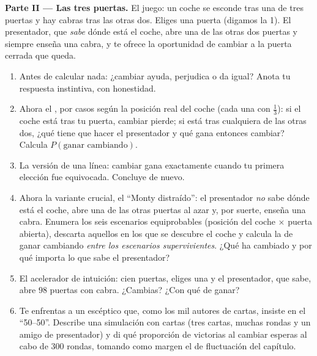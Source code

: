 \begin{problem}
\medskip
\noindent\textbf{Parte II --- Las tres puertas.}
El juego: un coche se esconde tras una de tres puertas y hay cabras tras
las otras dos. Eliges una puerta (digamos la 1). El presentador, que
\emph{sabe} dónde está el coche, abre una de las otras dos puertas y
siempre enseña una cabra, y te ofrece la oportunidad de cambiar a la
puerta cerrada que queda.
\begin{enumerate}[resume]
  \item Antes de calcular nada: ¿cambiar ayuda, perjudica o da igual?
        Anota tu respuesta instintiva, con honestidad.
  \item Ahora el , por casos según la posición real del coche (cada
        una con  $\frac13$): si el coche está tras tu puerta,
        cambiar pierde; si está tras cualquiera de las otras dos, ¿qué
        tiene que hacer el presentador y qué gana entonces cambiar?
        Calcula $P(\text{ganar cambiando})$.
  \item La versión de una línea: cambiar gana exactamente cuando tu
        primera elección fue equivocada. Concluye de nuevo.
  \item Ahora la variante crucial, el ``Monty distraído'': el presentador
        \emph{no} sabe dónde está el coche, abre una de las otras puertas
        al azar y, por suerte, enseña una cabra. Enumera los seis
        escenarios equiprobables (posición del coche $\times$ puerta
        abierta), descarta aquellos en los que se descubre el coche y
        calcula la  de ganar cambiando \emph{entre los
        escenarios supervivientes}. ¿Qué ha cambiado y por qué importa lo
        que sabe el presentador?
  \item El acelerador de intuición: cien puertas, eliges una y el
        presentador, que sabe, abre $98$ puertas con cabra. ¿Cambias? ¿Con
        qué  de ganar?
  \item Te enfrentas a un escéptico que, como los mil autores de cartas,
        insiste en el ``50--50''. Describe una simulación con cartas (tres
        cartas, muchas rondas y un amigo de presentador) y di qué
        proporción de victorias al cambiar esperas al cabo de $300$
        rondas, tomando como margen el  de fluctuación del
        capítulo.
\end{enumerate}


\end{problem}
